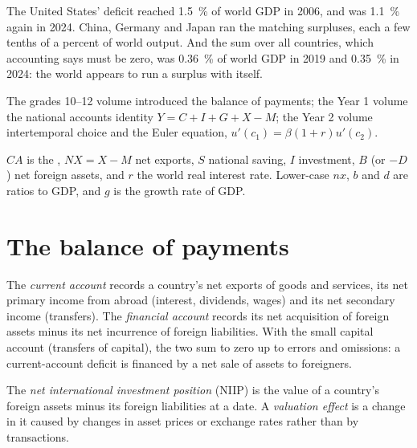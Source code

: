The United States' deficit reached 1.5~\% of world GDP in 2006, and was 1.1~\% again
in 2024. China, Germany and Japan ran the matching surpluses, each a few tenths of
a percent of world output. And the sum over all countries, which accounting says
must be zero, was 0.36~\% of world GDP in 2019 and 0.35~\% in 2024: the world
appears to run a surplus with itself.

\begin{recall}
The grades 10--12 volume introduced the balance of payments; the Year 1 volume the
national accounts identity $Y = C + I + G + X - M$; the Year 2 volume intertemporal
choice and the Euler equation, $u'(c_1) = \beta(1 + r)u'(c_2)$.
\end{recall}

\begin{notation}\label{not:b3:current-account:symbols}
$CA$ is the , $NX = X - M$ net exports, $S$ national saving, $I$
investment, $B$ (or $-D$) net foreign assets, and $r$ the world real interest rate.
Lower-case $nx$, $b$ and $d$ are ratios to GDP, and $g$ is the growth rate of GDP.
\end{notation}

\section{The balance of payments}\label{sec:b3:current-account:bop}

\begin{definition}\label{def:b3:current-account:accounts}
The \emph{current account} records a country's net exports of goods and services,
its net primary income from abroad (interest, dividends, wages) and its net
secondary income (transfers). The \emph{financial account} records its net
acquisition of foreign assets minus its net incurrence of foreign liabilities.
With the small capital account (transfers of capital), the two sum to zero up to
errors and omissions: a current-account deficit is financed by a net sale of
assets to foreigners.
\end{definition}

\begin{definition}\label{def:b3:current-account:niip}
The \emph{net international investment position} (NIIP) is the value of a
country's foreign assets minus its foreign liabilities at a date. A
\emph{valuation effect} is a change in it caused by changes in asset prices or
exchange rates rather than by transactions.
\end{definition}

